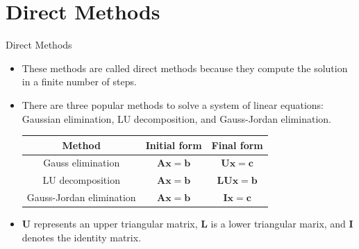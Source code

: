 \documentclass{beamer}
\begin{document}
\section[Direct Methods]{Direct Methods}
\begin{frame}{Direct Methods}
  \begin{itemize}
    
    \item These methods are called \alert{direct methods} because they compute the solution in a \alert{finite number of steps}.
    \item  There are three popular methods to solve a system of linear equations: Gaussian elimination, LU decomposition, and Gauss-Jordan elimination.
    
  \vspace{0.5cm}

  \begin{tabular}{|c|c|c|}
    \hline { Method } &  { Initial form } &  { Final form } \\
    \hline \hline { Gauss elimination } & $\mathbf{A x}=\mathbf{b}$ & $\mathbf{U x}=\mathbf{c}$ \\
    \hline  { LU decomposition } & $\mathbf{A x}=\mathbf{b}$ & $\mathbf{L U x}=\mathbf{b}$ \\
    \hline  { Gauss-Jordan elimination } & $\mathbf{A x}=\mathbf{b}$ & $\mathbf{I x}=\mathbf{c}$ \\
    \hline
    \end{tabular}

    \vspace{0.5cm}

      \item  $\mathbf{U}$ represents an upper triangular matrix, $\mathbf{L}$ is a lower triangular marix, and $\mathbf{I}$ denotes the identity matrix.
    \end{itemize}
\end{frame}
\end{document}
